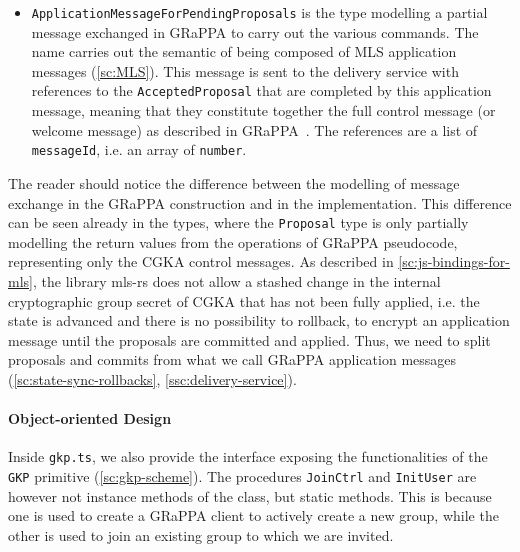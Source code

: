 \begin{itemize}
    \item \texttt{ApplicationMessageForPendingProposals} is the type modelling a partial message exchanged in GRaPPA
    to carry out the various commands. The name carries out the semantic of being composed of 
    MLS application messages (\cref{sc:MLS}). This message is sent to the delivery service
    with references to the \texttt{AcceptedProposal} that are completed by this application
    message, meaning that they constitute together the full control message (or welcome message) as described in
    GRaPPA~\cite{GKP}. The references are a list of \texttt{messageId}, i.e. an array of \texttt{number}.

\end{itemize}

The reader should notice the difference between the modelling of message exchange
in the GRaPPA construction and in the implementation. This
difference can be seen already in the types, where the \texttt{Proposal} type is only 
partially modelling the return values from the operations of 
GRaPPA pseudocode, representing only the CGKA control messages. 
As described in \cref{sc:js-bindings-for-mls},
the library mls-rs does not allow a stashed change in the internal 
cryptographic group secret of CGKA that has not been fully applied,
i.e. the state is advanced and there is no possibility to rollback, 
to encrypt an application message until the proposals are committed and applied. 
Thus, we need to split proposals and commits from what we call GRaPPA application messages (\cref{sc:state-sync-rollbacks}, \cref{ssc:delivery-service}).

\paragraph{Object-oriented Design}
Inside \texttt{gkp.ts}, we also provide the interface exposing the functionalities 
of the \texttt{GKP} primitive (\cref{sc:gkp-scheme}). 
The procedures \texttt{JoinCtrl} and \texttt{InitUser} are however not instance
methods of the class, but static methods. This is because one is used to create
a GRaPPA client to actively create a new group, while the other is used to
join an existing group to which we are invited. 

